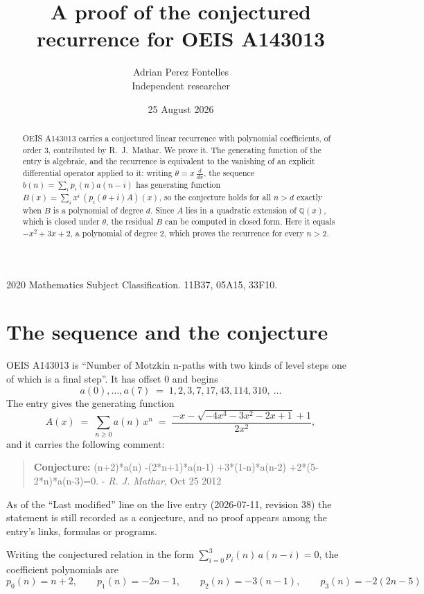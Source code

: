 \documentclass[11pt,a4paper]{article}
\title{A proof of the conjectured recurrence for OEIS A143013}
\author{Adrian Perez Fontelles\\ \small Independent researcher}
\date{25 August 2026}
\theoremstyle{plain}
\theoremstyle{definition}
\begin{document}
\maketitle

\begin{abstract}
OEIS A143013 carries a conjectured linear recurrence with polynomial coefficients, of
order 3, contributed by R.~J.~Mathar. We prove it. The generating function of the
entry is algebraic, and the recurrence is equivalent to the vanishing of an explicit
differential operator applied to it: writing $\theta=x\,\frac{d}{dx}$, the sequence
$b(n)=\sum_{i}p_{i}(n)a(n-i)$ has generating function
$B(x)=\sum_{i}x^{i}\,(p_{i}(\theta+i)A)(x)$, so the conjecture holds for all $n>d$ exactly
when $B$ is a polynomial of degree $d$. Since $A$ lies in a quadratic extension of
$\mathbb{Q}(x)$, which is closed under $\theta$, the residual $B$ can be computed in
closed form. Here it equals $- x^{2} + 3 x + 2$, a polynomial of degree $2$, which proves
the recurrence for every $n>2$.
\end{abstract}

\noindent\small 2020 Mathematics Subject Classification. 11B37, 05A15, 33F10.\normalsize

\section{The sequence and the conjecture}

OEIS A143013 is ``Number of Motzkin n-paths with two kinds of level steps one of which is a final step''. It has offset $0$ and begins
\[
a(0),\dots,a(7)\;=\;1, 2, 3, 7, 17, 43, 114, 310,\ \dots
\]
The entry gives the generating function
\begin{equation}\label{eq:gf}
A(x)\;=\;\sum_{n\ge 0} a(n)\,x^{n}\;=\;\frac{- x - \sqrt{- 4 x^{3} - 3 x^{2} - 2 x + 1} + 1}{2 x^{2}} ,
\end{equation}
and it carries the following comment:
\begin{quote}\small
\textbf{Conjecture:} (n+2)*a(n) -(2*n+1)*a(n-1) +3*(1-n)*a(n-2) +2*(5-2*n)*a(n-3)=0. - \emph{R. J. Mathar}, Oct 25 2012
\end{quote}
As of the ``Last modified'' line on the live entry (2026-07-11, revision 38) the
statement is still recorded as a conjecture, and no proof appears among the entry's links,
formulas or programs.

Writing the conjectured relation in the form $\sum_{i=0}^{3}p_{i}(n)\,a(n-i)=0$,
the coefficient polynomials are
\[
p_{0}(n)=n + 2,\qquad p_{1}(n)=- 2 n - 1,\qquad p_{2}(n)=- 3 \left(n - 1\right),\qquad p_{3}(n)=- 2 \left(2 n - 5\right)
\]
\end{document}
